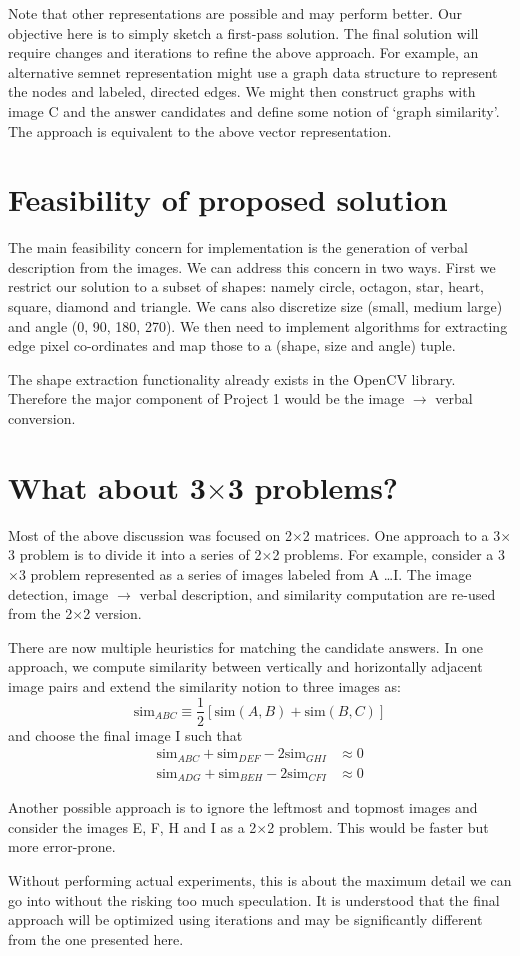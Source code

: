 \documentclass[10pt,letterpaper]{article}
\begin{document}
Note that other representations are possible and may perform better. Our objective here is to simply sketch a first-pass solution. The final solution will require changes and iterations to refine the above approach. For example, an alternative semnet representation might use a graph data structure to represent the nodes and labeled, directed edges. We might then construct graphs with image C and the answer candidates and define some notion of `graph similarity'. The approach is equivalent to the above vector representation.
\section{Feasibility of proposed solution}
The main feasibility concern for implementation is the generation of verbal description from the images. We can address this concern in two ways. First we restrict our solution to a subset of shapes: namely circle, octagon, star, heart, square, diamond and triangle. We cans also discretize size (small, medium large) and angle (0, 90, 180, 270). We then need to implement algorithms for extracting edge pixel co-ordinates and map those to a (shape, size and angle) tuple. 

The shape extraction functionality already exists in the OpenCV library. Therefore  the major component of Project 1 would be the image $\to$ verbal conversion. 
\section{What about 3$\times$3 problems?}
Most of the above discussion was focused on 2$\times$2 matrices. One approach to a 3$\times$3 problem is to divide it into a series of  2$\times$2 problems. For example, consider a  3$\times$3 problem represented as a series of images labeled from A \ldots I. The image detection, image $\to$ verbal description, and similarity computation are re-used from the 2$\times$2 version. 

There are now multiple heuristics for matching the candidate answers. In one approach, we compute similarity between vertically and horizontally adjacent image pairs and extend the similarity notion to three images as:
\begin{equation}
\text{sim}_{ABC} \equiv \frac{1}{2} \left[\text{sim}(A, B) + \text{sim}(B, C)\right]
\end{equation}
and choose the final image I such that 
\begin{align*}
\text{sim}_{ABC} + \text{sim}_{DEF} - 2\text{sim}_{GHI} &\approx 0\\
\text{sim}_{ADG} + \text{sim}_{BEH} - 2\text{sim}_{CFI} &\approx 0
\end{align*}

Another possible approach is to ignore the leftmost and topmost images and consider the images E, F, H and I as a 2$\times$2 problem. This would be faster but more error-prone. 

Without performing actual experiments, this is about the maximum detail we can go into without the risking too much speculation. It is understood that the final approach will be optimized using iterations and may be significantly different from the one presented here. 
\end{document}
